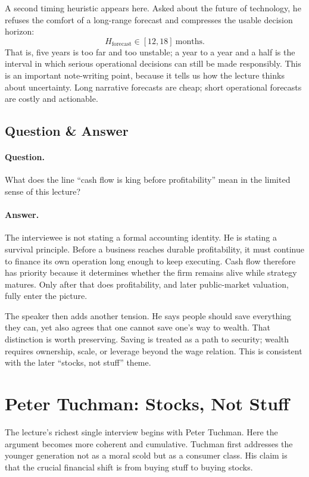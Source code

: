 A second timing heuristic appears here. Asked about the future of technology, he refuses the comfort of a long-range forecast and compresses the usable decision horizon:
\begin{equation}
H_{\mathrm{forecast}} \in [12,18]\ \mathrm{months}.
\end{equation}
That is, five years is too far and too unstable; a year to a year and a half is the interval in which serious operational decisions can still be made responsibly. This is an important note-writing point, because it tells us how the lecture thinks about uncertainty. Long narrative forecasts are cheap; short operational forecasts are costly and actionable.

\subsection{Question \& Answer}

\paragraph{Question.} What does the line ``cash flow is king before profitability'' mean in the limited sense of this lecture?

\paragraph{Answer.} The interviewee is not stating a formal accounting identity. He is stating a survival principle. Before a business reaches durable profitability, it must continue to finance its own operation long enough to keep executing. Cash flow therefore has priority because it determines whether the firm remains alive while strategy matures. Only after that does profitability, and later public-market valuation, fully enter the picture.

The speaker then adds another tension. He says people should save everything they can, yet also agrees that one cannot save one's way to wealth. That distinction is worth preserving. Saving is treated as a path to security; wealth requires ownership, scale, or leverage beyond the wage relation. This is consistent with the later ``stocks, not stuff'' theme.

\section{Peter Tuchman: Stocks, Not Stuff}

The lecture's richest single interview begins with Peter Tuchman. Here the argument becomes more coherent and cumulative. Tuchman first addresses the younger generation not as a moral scold but as a consumer class. His claim is that the crucial financial shift is from buying stuff to buying stocks.

